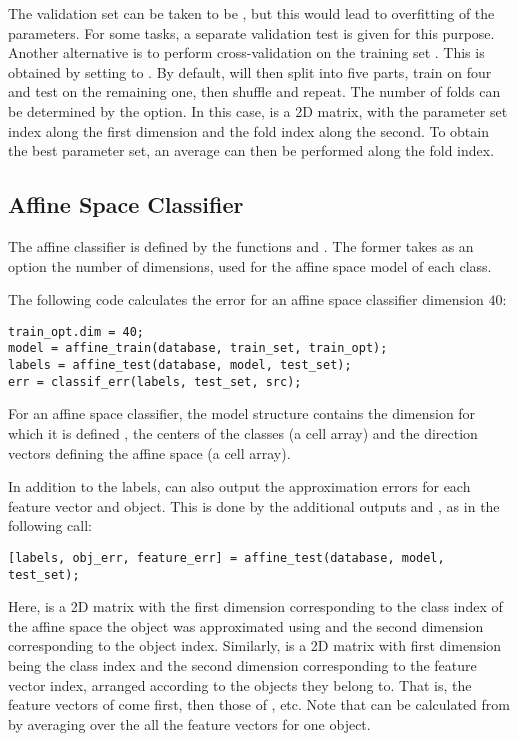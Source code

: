 \documentclass{article}
\begin{document}
The validation set can be taken to be , but this would lead to overfitting of the parameters. For some tasks, a separate validation test is given for this purpose. Another alternative is to perform cross-validation on the training set . This is obtained by setting  to \mcode{[]}. By default,  will then split  into five parts, train on four and test on the remaining one, then shuffle and repeat. The number of folds can be determined by the  option. In this case,  is a 2D matrix, with the parameter set index along the first dimension and the fold index along the second. To obtain the best parameter set, an average can then be performed along the fold index.

\subsection{Affine Space Classifier}

The affine classifier is defined by the functions  and . The former takes as an option the number of dimensions,  used for the affine space model of each class. 

The following code calculates the error for an affine space classifier dimension $40$:
\begin{lstlisting}
train_opt.dim = 40;
model = affine_train(database, train_set, train_opt);
labels = affine_test(database, model, test_set);
err = classif_err(labels, test_set, src);
\end{lstlisting}

For an affine space classifier, the model structure contains the dimension for which it is defined , the centers of the classes  (a cell array) and the direction vectors defining the affine space  (a cell array).

In addition to the labels,  can also output the approximation errors for each feature vector and object. This is done by the additional outputs  and , as in the following call:
\begin{lstlisting}
[labels, obj_err, feature_err] = affine_test(database, model, test_set);
\end{lstlisting}
Here,  is a 2D matrix with the first dimension corresponding to the class index of the affine space the object was approximated using and the second dimension corresponding to the object index. Similarly,  is a 2D matrix with first dimension being the class index and the second dimension corresponding to the feature vector index, arranged according to the objects they belong to. That is, the feature vectors of  come first, then those of , etc. Note that  can be calculated from  by averaging over the all the feature vectors for one object.
\end{document}
